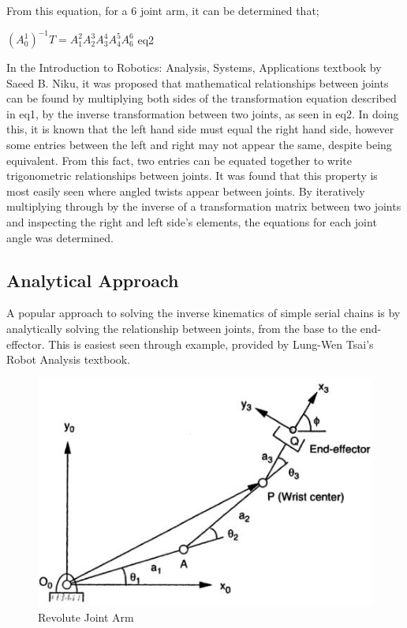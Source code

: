 \documentclass[12pt,openany,a4paper]{book}
\begin{document}
From this equation, for a 6 joint arm, it can be determined that;
 
$(A_{0}^{1})^{-1} T = A_{1}^{2} A_{2}^{3} A_{3}^{4} A_{4}^{5} A_{6}^{6}$ eq2

In the Introduction to Robotics: Analysis, Systems, Applications textbook by Saeed B. Niku, it was proposed that mathematical relationships between joints can be found by multiplying both sides of the transformation equation described in eq1, by the inverse transformation between two joints, as seen in eq2. In doing this, it is known that the left hand side must equal the right hand side, however some entries between the left and right may not appear the same, despite being equivalent. From this fact, two entries can be equated together to write trigonometric relationships between joints. It was found that this property is most easily seen where angled twists appear between joints. By iteratively multiplying through by the inverse of a transformation matrix between two joints and inspecting the right and left side's elements, the equations for each joint angle was determined. 

\subsection{Analytical Approach}

A popular approach to solving the inverse kinematics of simple serial chains is by analytically solving the relationship between joints, from the base to the end-effector. This is easiest seen through example, provided by Lung-Wen Tsai's Robot Analysis textbook.

\begin{center}
\begin{figure}[htb]
  \includegraphics[width=0.8\linewidth]{Tsai_3rr.jpg}
\caption{Revolute Joint Arm}
\end{figure}
\end{center}
\end{document}
